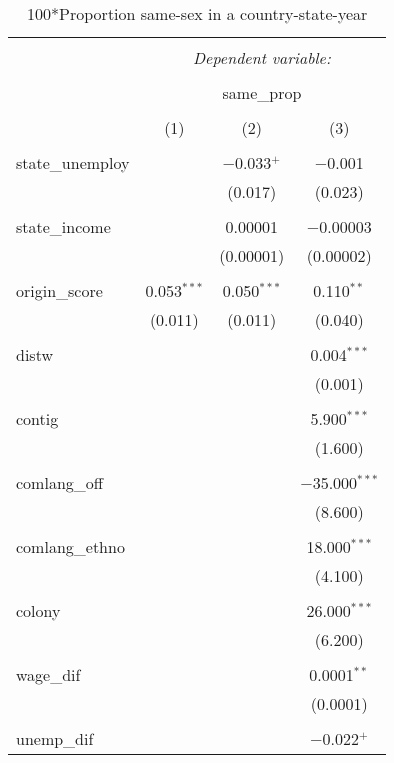 \documentclass[11pt,]{article}
\begin{document}
\begin{table}[!htbp] \centering 
  \caption{100*Proportion same-sex in a country-state-year} 
  \label{tab:state-props} 
\begin{tabular}{@{\extracolsep{5pt}}lccc} 
\\[-1.8ex]\hline 
\hline \\[-1.8ex] 
 & \multicolumn{3}{c}{\textit{Dependent variable:}} \\ 
\cline{2-4} 
\\[-1.8ex] & \multicolumn{3}{c}{same\_prop} \\ 
\\[-1.8ex] & (1) & (2) & (3)\\ 
\hline \\[-1.8ex] 
 state\_unemploy &  & $-$0.033$^{+}$ & $-$0.001 \\ 
  &  & (0.017) & (0.023) \\ 
  & & & \\ 
 state\_income &  & 0.00001 & $-$0.00003 \\ 
  &  & (0.00001) & (0.00002) \\ 
  & & & \\ 
 origin\_score & 0.053$^{***}$ & 0.050$^{***}$ & 0.110$^{**}$ \\ 
  & (0.011) & (0.011) & (0.040) \\ 
  & & & \\ 
 distw &  &  & 0.004$^{***}$ \\ 
  &  &  & (0.001) \\ 
  & & & \\ 
 contig &  &  & 5.900$^{***}$ \\ 
  &  &  & (1.600) \\ 
  & & & \\ 
 comlang\_off &  &  & $-$35.000$^{***}$ \\ 
  &  &  & (8.600) \\ 
  & & & \\ 
 comlang\_ethno &  &  & 18.000$^{***}$ \\ 
  &  &  & (4.100) \\ 
  & & & \\ 
 colony &  &  & 26.000$^{***}$ \\ 
  &  &  & (6.200) \\ 
  & & & \\ 
 wage\_dif &  &  & 0.0001$^{**}$ \\ 
  &  &  & (0.0001) \\ 
  & & & \\ 
 unemp\_dif &  &  & $-$0.022$^{+}$ \\ 

\end{tabular}
\end{table}
\end{document}
